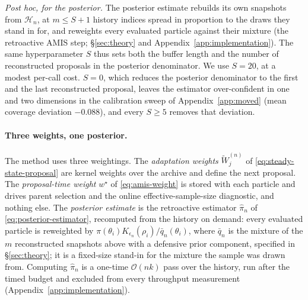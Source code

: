 \documentclass[pdflatex,sn-mathphys-num]{sn-jnl}
\theoremstyle{plain}
\theoremstyle{definition}
\begin{document}
\emph{Post hoc, for the posterior.} The posterior estimate rebuilds its own snapshots from $\mathcal{H}_n$, at $m\le S{+}1$ history indices spread in proportion to the draws they stand in for, and reweights every evaluated particle against their mixture (the retroactive AMIS step; \S\ref{sec:theory} and Appendix~\ref{app:implementation}). The same hyperparameter $S$ thus sets both the buffer length and the number of reconstructed proposals in the posterior denominator. We use $S=20$, at a modest per-call cost. $S=0$, which reduces the posterior denominator to the first and the last reconstructed proposal, leaves the estimator over-confident in one and two dimensions in the calibration sweep of Appendix~\ref{app:moved} (mean coverage deviation $-0.088$), and every $S\ge5$ removes that deviation.

\paragraph{Three weights, one posterior.} The method uses three weightings. The \emph{adaptation weights} $\tilde W^{(n)}_j$ of \eqref{eq:steady-state-proposal} are kernel weights over the archive and define the next proposal. The \emph{proposal-time weight} $w^\star$ of \eqref{eq:amis-weight} is stored with each particle and drives parent selection and the online effective-sample-size diagnostic, and nothing else. The \emph{posterior estimate} is the retroactive estimator $\widehat\pi_n$ of \eqref{eq:posterior-estimator}, recomputed from the history on demand: every evaluated particle is reweighted by $\pi(\theta_i)K_{\epsilon_n}(\rho_i)/\bar q_n(\theta_i)$, where $\bar q_n$ is the mixture of the $m$ reconstructed snapshots above with a defensive prior component, specified in \S\ref{sec:theory}; it is a fixed-size stand-in for the mixture the sample was drawn from. Computing $\widehat\pi_n$ is a one-time $\mathcal{O}(nk)$ pass over the history, run after the timed budget and excluded from every throughput measurement (Appendix~\ref{app:implementation}).
\end{document}
